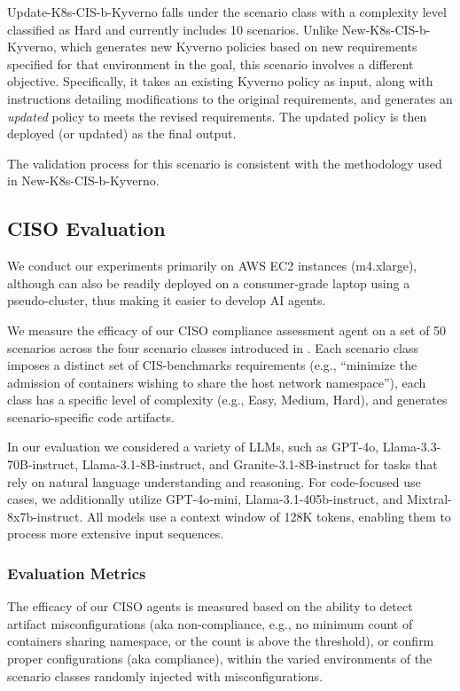 Update-K8s-CIS-b-Kyverno falls under the scenario class with a complexity level classified as Hard and currently includes 10 scenarios. Unlike New-K8s-CIS-b-Kyverno, which generates new Kyverno policies based on new requirements specified for that environment in the goal, this scenario involves a different objective. Specifically, it takes an existing Kyverno policy as input, along with instructions detailing modifications to the original requirements, and generates an \textit{updated} policy to meets the revised requirements. The updated policy is then deployed (or updated) as the final output.

The validation process for this scenario is consistent with the methodology used in New-K8s-CIS-b-Kyverno.

\subsection{CISO \bench Evaluation}
 
We conduct our experiments primarily on AWS EC2 instances (m4.xlarge), although \bench can also be readily deployed on a consumer-grade laptop using a pseudo-cluster, thus making it easier to develop AI agents.

We measure the efficacy of our CISO compliance assessment agent on a set of 50 scenarios across the four scenario classes introduced in . Each scenario class imposes a distinct set of CIS-benchmarks requirements (e.g., ``minimize the admission of containers wishing to share the host network namespace''), each class has a specific level of complexity (e.g., Easy, Medium, Hard), and generates scenario-specific code artifacts. 

In our evaluation we considered a variety of LLMs, such as GPT-4o, Llama-3.3-70B-instruct, Llama-3.1-8B-instruct, and Granite-3.1-8B-instruct for tasks that rely on natural language understanding and reasoning. For code-focused use cases, we additionally utilize GPT-4o-mini, Llama-3.1-405b-instruct, and Mixtral-8x7b-instruct. 
All models use a context window of 128K tokens, enabling them to process more extensive input sequences.


\subsubsection{Evaluation Metrics}

The efficacy of our CISO agents is measured based on the ability to detect artifact misconfigurations (aka non-compliance, e.g., no minimum count of containers sharing namespace, or the count is above the threshold), or confirm proper configurations (aka compliance), within the varied environments of the scenario classes randomly injected with misconfigurations. 

